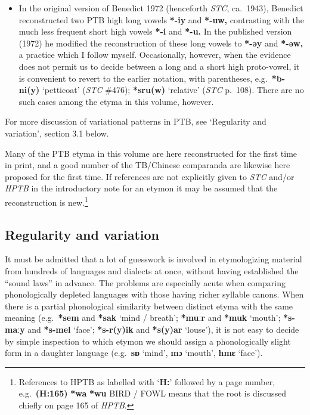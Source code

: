 \begin{itemize}
\item In the original version of Benedict 1972 (henceforth \textit{STC}, ca.~1943), Benedict reconstructed two PTB high
long vowels \textbf{*-iy} and \textbf{*-uw,} contrasting with the much less frequent short high
vowels \textbf{*-i} and \textbf{*-u.}  In the published version (1972) he modified the
reconstruction of these long vowels to \textbf{*-əy} and \textbf{*-əw,} a practice which I follow
myself.  Occasionally, however, when the evidence does not permit us to decide
between a long and a short high proto-vowel, it is convenient to revert to the
earlier notation, with parentheses, e.g.\ \textbf{*b-ni(y)} ‘petticoat’ (\textit{STC} \#476);
\textbf{*sru(w)} ‘relative’ (\textit{STC} p.~108).  There are no such cases among the etyma in
this volume, however.
\end{itemize}


For more discussion of variational patterns in PTB, see ‘Regularity and
variation’, section 3.1 below.


Many of the PTB etyma in this volume are here reconstructed for the first
time in print, and a good number of the TB/Chinese comparanda are likewise here
proposed for the first time.  If references are not explicitly given to \textit{STC}
and/or \textit{HPTB} in the introductory note for an etymon it may be assumed that the
reconstruction is new.\footnote{References to HPTB as labelled with ‘\textbf{H:}’ followed by a page number, e.g.\ \textbf{(H:165)} \textbf{*wa}  \textbf{*wu} BIRD / FOWL means that the root is discussed chiefly on page 165 of \textit{HPTB}.}

\subsection{Regularity and variation}

It must be admitted that a lot of guesswork is involved in etymologizing
material from hundreds of languages and dialects at once, without having
established the “sound laws” in advance. The problems are especially acute when
comparing phonologically depleted languages with those having richer syllable
canons. When there is a partial phonological similarity between distinct etyma
with the same meaning (e.g.\ \textbf{*sem} and \textbf{*sak}  ‘mind / breath’;
\textbf{*muːr} and \textbf{*muk}
‘mouth’; \textbf{*s-maːy} and \textbf{*s-mel} ‘face’;
\textbf{*s-r(y)ik} and \textbf{*s(y)ar} ‘louse’), it is not
easy to decide by simple inspection to which etymon we should assign a
phonologically slight form in a daughter language (e.g.\ \textbf{sɒ} ‘mind’,
\textbf{mɔ} ‘mouth’,
\textbf{hmɛ} ‘face’).


